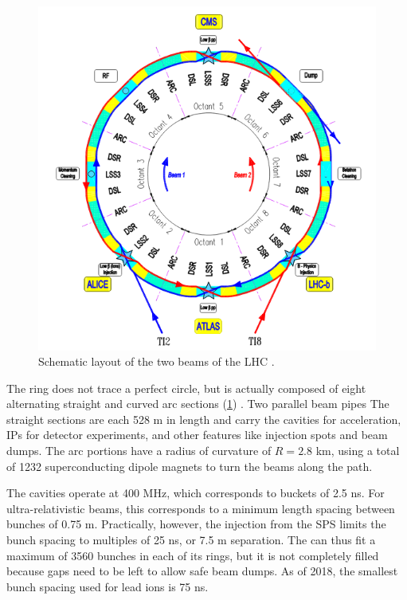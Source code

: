 \begin{figure}[t]
\includegraphics{LHC_schematic.png}
\caption{Schematic layout of the two beams of the \acs{LHC} \cite{Bruning:2004ej}.}
\label{fig:lhc_schematic}
\end{figure}

The \lhc ring does not trace a perfect circle, but is actually composed of eight alternating straight and curved arc sections (\cref{fig:lhc_schematic}) \cite{Bruning:2004ej}.
Two parallel beam pipes 
The straight sections are each 528 m in length and carry the \rf cavities for acceleration, \acp{IP} for detector experiments, and other features like injection spots and beam dumps.
The arc portions have a radius of curvature of $R = 2.8$ km, using a total of 1232 superconducting dipole magnets to turn the beams along the path.

The \rf cavities operate at 400 MHz, which corresponds to \rf buckets of 2.5 ns.
For ultra-relativistic beams, this corresponds to a minimum length spacing between bunches of 0.75 m.
Practically, however, the injection from the \ac{SPS} limits the bunch spacing to multiples of 25 ns, or 7.5 m separation.
The \lhc can thus fit a maximum of 3560 bunches in each of its rings, but it is not completely filled because gaps need to be left to allow safe beam dumps.
As of 2018, the smallest bunch spacing used for lead ions is 75 ns.

